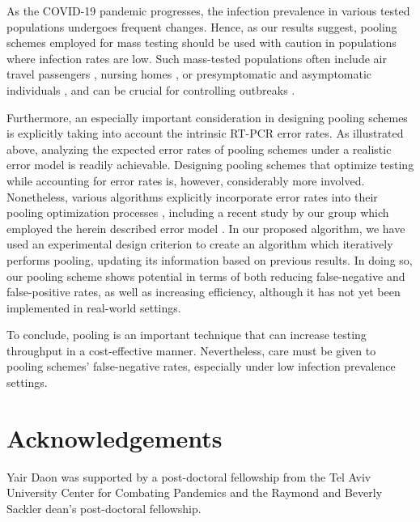 \documentclass{article}
\begin{document}
As the COVID-19 pandemic progresses, the infection prevalence in
various tested populations undergoes frequent changes. Hence, as our
results suggest, pooling schemes employed for mass testing should be
used with caution in populations where infection rates are low. Such
mass-tested populations often include air travel passengers
\cite{JTM}, nursing homes \cite{DorfmanYuvalDor}, or presymptomatic
and asymptomatic individuals \cite{RobinHood}, and can be crucial for
controlling outbreaks \cite{MinaScience}.

Furthermore, an especially important consideration in designing
pooling schemes is explicitly taking into account the intrinsic RT-PCR
error rates. As illustrated above, analyzing the expected error rates
of pooling schemes under a realistic error model is readily
achievable. Designing pooling schemes that optimize testing while
accounting for error rates is, however, considerably more involved.
Nonetheless, various algorithms explicitly incorporate error rates
into their pooling optimization processes \cite{Kim,
  OptimalDorfmanPool}, including a recent study by our group which
employed the herein described error model \cite{DOPE}.  In our
proposed algorithm, we have used an experimental design criterion to
create an algorithm which iteratively performs pooling, updating its
information based on previous results. In doing so, our pooling scheme
shows potential in terms of both reducing false-negative and
false-positive rates, as well as increasing efficiency, although it
has not yet been implemented in real-world settings.

To conclude, pooling is an important technique that can increase
testing throughput in a cost-effective manner. Nevertheless, care must
be given to pooling schemes' false-negative rates, especially under
low infection prevalence settings.

\section*{Acknowledgements}
Yair Daon was supported by a post-doctoral fellowship from the Tel
Aviv University Center for Combating Pandemics and the Raymond and
Beverly Sackler dean's post-doctoral fellowship.



\end{document}
